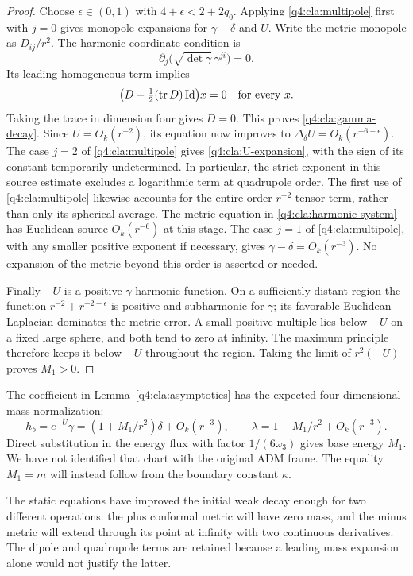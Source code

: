 \begin{proof}
Choose $\epsilon\in(0,1)$ with $4+\epsilon<2+2q_0$.
Applying \eqref{q4:cla:multipole} first with $j=0$ gives monopole
expansions for $\gamma-\delta$ and $U$.  Write the metric monopole as
$D_{ij}/r^2$.  The harmonic-coordinate condition is
\[
 \partial_j\bigl(\sqrt{\det\gamma}\,\gamma^{ji}\bigr)=0.
\]
Its leading homogeneous term implies
\[
 \bigl(D-\tfrac12(\operatorname{tr} D)\operatorname{Id}\bigr)x=0
       \quad\hbox{for every }x.
\]
Taking the trace in dimension four gives $D=0$.
This proves \eqref{q4:cla:gamma-decay}.  Since $U=O_k(r^{-2})$, its
equation now improves to
$\Delta_\delta U=O_k(r^{-6-\epsilon})$.
The case $j=2$ of \eqref{q4:cla:multipole} gives
\eqref{q4:cla:U-expansion}, with the sign of its constant temporarily
undetermined.  In particular, the strict exponent in this source
estimate excludes a logarithmic term at quadrupole order.  The first
use of \eqref{q4:cla:multipole} likewise accounts for the entire order
$r^{-2}$ tensor term, rather than only its spherical average.
The metric equation in
\eqref{q4:cla:harmonic-system} has Euclidean source $O_k(r^{-6})$ at this
stage.  The case $j=1$ of \eqref{q4:cla:multipole}, with any smaller
positive exponent if necessary, gives
$\gamma-\delta=O_k(r^{-3})$.
No expansion of the metric beyond this order is asserted or needed.

Finally $-U$ is a positive $\gamma$-harmonic function.
On a sufficiently distant region the function
$r^{-2}+r^{-2-\epsilon}$ is positive and subharmonic for $\gamma$;
its favorable Euclidean Laplacian dominates the metric error.
A small positive multiple lies below $-U$ on a fixed large sphere,
and both tend to zero at infinity.  The maximum principle therefore
keeps it below $-U$ throughout the region.  Taking the limit of
$r^2(-U)$ proves $M_1>0$.
\end{proof}

\begin{remark}\label{q4:cla:base-mass}
The coefficient in Lemma~\ref{q4:cla:asymptotics} has the expected
four-dimensional mass normalization:
\[
 h_b=e^{-U}\gamma
       =(1+M_1/r^2)\delta+O_k(r^{-3}),\qquad
 \lambda=1-M_1/r^2+O_k(r^{-3}).
\]
Direct substitution in the energy flux with factor $1/(6\omega_3)$
gives base energy $M_1$.  We have not identified that chart with the
original ADM frame.  The equality $M_1=m$ will instead follow from
the boundary constant $\kappa$.
\end{remark}

The static equations have improved the initial weak decay enough for
two different operations: the plus conformal metric will have zero mass,
and the minus metric will extend through its point at infinity with two
continuous derivatives. The dipole and quadrupole terms are retained
because a leading mass expansion alone would not justify the latter.

